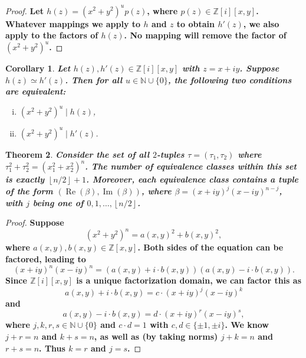 \documentclass[12pt,table]{article}
\newtheorem{theorem}{Theorem}
\newtheorem{corollary}[theorem]{Corollary}
\numberwithin{equation}{section}
\DeclareMathOperator{\Imag}{Im}
\DeclareMathOperator{\Real}{Re}
\newcommand{\myfrac}[2]{#1 / #2}
\newcommand{\Nnn}{\mathbb N}
\newcommand{\Zzz}{\mathbb Z}
\newcommand{\vanish}[1]{}
\newcommand{\divides}{\mid}
\begin{document}
\begin{landscape}
{{\begin{proof}
\bf
Let $ h(z) = ( x^2 + y^2 ) ^ u  p(z) $, where $ p(z) \in \Zzz [i][x,y] $. 
Whatever mappings we apply to $h$ and $z$
to obtain $ h'(z) $, we also apply to the factors of $ h(z) $. 
No mapping will remove the factor of $ ( x^2 + y^2 ) ^ u $.
\end{proof}

\vanish{
\begin{corollary}
\bf
Let $ h(z), h'(z) \in \Zzz[i][x,y] $ with $ z = x+ iy $.
\[
h(z) \simeq h'(z) 
\implies 
( \forall u \in \Nnn \cup \{ 0 \},  ( x^2 + y^2 ) ^ u \divides h(z)  \iff ( x^2 + y^2 ) ^ u \divides h'(z)  )
\]
\end{corollary}
}

\begin{corollary}
\label{corollary_equivalence}
\bf
Let $ h(z), h'(z) \in \Zzz[i][x,y] $ with $ z = x+ iy $.
Suppose $ h(z) \simeq h'(z) $. Then for all  $ u \in \Nnn \cup \{ 0 \} $,
the following two conditions are
equivalent:
\begin{enumerate}[i.]
\item $ ( x^2 + y^2 ) ^ u \divides h(z) $,
\item $ ( x^2 + y^2 ) ^ u \divides h'(z) $.
\end{enumerate}
\end{corollary}



\begin{theorem}
\label{thm:2D_equivalence}
\bf
Consider the set of all $2$-tuples $ \tau = ( \tau_1, \tau_2 )$ where 
$
  \tau_1 ^ 2   +   \tau_2 ^ 2   
= 
\left(  x_1 ^ 2 + x_2 ^ 2  \right) ^ n 
$.
The number of equivalence classes within this set 
is exactly  $ \left\lfloor \myfrac{n}{2} \right\rfloor + 1 $. 
Moreover, each equivalence class contains a tuple
of the form $ ( \Real( \beta ) , \Imag( \beta ) ) $,
where $ \beta = (x + iy)^j (x -  iy)^{n-j} $,
with $ j $
being one of $ 0, 1, \dotsc, \left\lfloor \myfrac{n}{2} \right\rfloor $.
\end{theorem}
\begin{proof}
\bf
Suppose 
\[
(x^2 + y^2)^n = a(x,y)^2 + b(x,y)^2,
\]
where $ a(x,y), b(x,y) \in \Zzz[x,y] $.
Both sides of the equation can be factored, leading to  
\[
(x + iy)^n (x -  iy)^n = ( a(x,y) + i \cdot b(x,y) ) ( a(x,y) - i \cdot b(x,y) ) .
\]
Since $ \Zzz [i][x,y] $ is a unique factorization domain,
we can factor this as
\[
a(x,y) + i \cdot b(x,y) = c \cdot (x + iy)^j (x -  iy)^k
\]
and
\[
a(x,y) - i \cdot b(x,y) = d \cdot (x + iy)^r (x -  iy)^s,
\]
where $ j, k, r, s \in \Nnn \cup \{0\} $ and
$c \cdot d = 1 $ with $ c,d \in \{ \pm 1 , \pm i \} $. 
We know $ j + r = n $ and $ k + s = n $, as well as
(by taking norms) $ j + k = n $ and $ r + s = n $.
Thus $k = r$ and $j = s$.


\end{proof}}}
\end{landscape}
\end{document}
